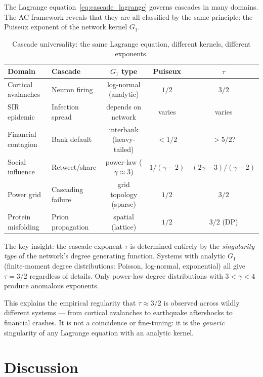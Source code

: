 \documentclass[11pt,a4paper]{article}
\theoremstyle{definition}
\begin{document}
The Lagrange equation~\eqref{eq:cascade_lagrange} governs cascades in
many domains. The AC framework reveals that they are all classified by
the same principle: the Puiseux exponent of the network kernel $G_1$.

\begin{table}[H]
\centering
\caption{Cascade universality: the same Lagrange equation,
different kernels, different exponents.}
\renewcommand{\arraystretch}{1.2}
\begin{tabular}{p{3cm}p{3cm}ccc}
\toprule
Domain & Cascade & $G_1$ type & Puiseux & $\tau$ \\
\midrule
Cortical avalanches & Neuron firing & log-normal (analytic) & $1/2$ & $3/2$ \\
SIR epidemic & Infection spread & depends on network & varies & varies \\
Financial contagion & Bank default & interbank (heavy-tailed) & $<1/2$ & $>5/2$? \\
Social influence & Retweet/share & power-law ($\gamma \approx 3$) & $1/(\gamma{-}2)$ & $(2\gamma{-}3)/(\gamma{-}2)$ \\
Power grid & Cascading failure & grid topology (sparse) & $1/2$ & $3/2$ \\
Protein misfolding & Prion propagation & spatial (lattice) & $1/2$ & $3/2$ (DP) \\
\bottomrule
\end{tabular}
\end{table}

The key insight: the cascade exponent $\tau$ is determined entirely
by the \emph{singularity type} of the network's degree generating
function. Systems with analytic $G_1$ (finite-moment degree distributions:
Poisson, log-normal, exponential) all give $\tau = 3/2$ regardless of
details. Only power-law degree distributions with $3 < \gamma < 4$
produce anomalous exponents.

This explains the empirical regularity that $\tau \approx 3/2$ is observed
across wildly different systems --- from cortical avalanches to earthquake
aftershocks to financial crashes. It is not a coincidence or fine-tuning:
it is the \emph{generic} singularity of any Lagrange equation with an
analytic kernel.


\section{Discussion}
\label{sec:discussion}
\end{document}
